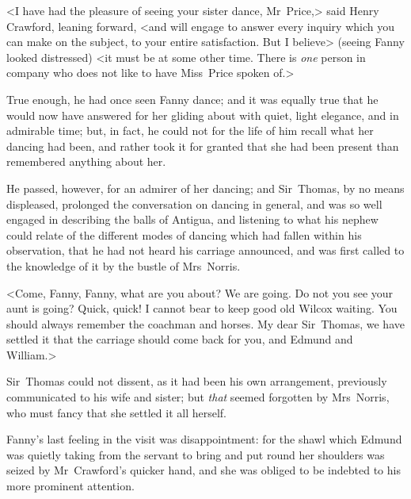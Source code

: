 <I have had the pleasure of seeing your sister dance, Mr~Price,> said Henry Crawford, leaning forward, <and will engage to answer every inquiry which you can make on the subject, to your entire satisfaction. But I believe> (seeing Fanny looked distressed) <it must be at some other time. There is \textit{one}  person in company who does not like to have Miss~Price spoken of.>

True enough, he had once seen Fanny dance; and it was equally true that he would now have answered for her gliding about with quiet, light elegance, and in admirable time; but, in fact, he could not for the life of him recall what her dancing had been, and rather took it for granted that she had been present than remembered anything about her.

He passed, however, for an admirer of her dancing; and Sir~Thomas, by no means displeased, prolonged the conversation on dancing in general, and was so well engaged in describing the balls of Antigua, and listening to what his nephew could relate of the different modes of dancing which had fallen within his observation, that he had not heard his carriage announced, and was first called to the knowledge of it by the bustle of Mrs~Norris.

<Come, Fanny, Fanny, what are you about? We are going. Do not you see your aunt is going? Quick, quick! I cannot bear to keep good old Wilcox waiting. You should always remember the coachman and horses. My dear Sir~Thomas, we have settled it that the carriage should come back for you, and Edmund and William.>

Sir~Thomas could not dissent, as it had been his own arrangement, previously communicated to his wife and sister; but \textit{that}  seemed forgotten by Mrs~Norris, who must fancy that she settled it all herself.

Fanny's last feeling in the visit was disappointment: for the shawl which Edmund was quietly taking from the servant to bring and put round her shoulders was seized by Mr~Crawford's quicker hand, and she was obliged to be indebted to his more prominent attention. 